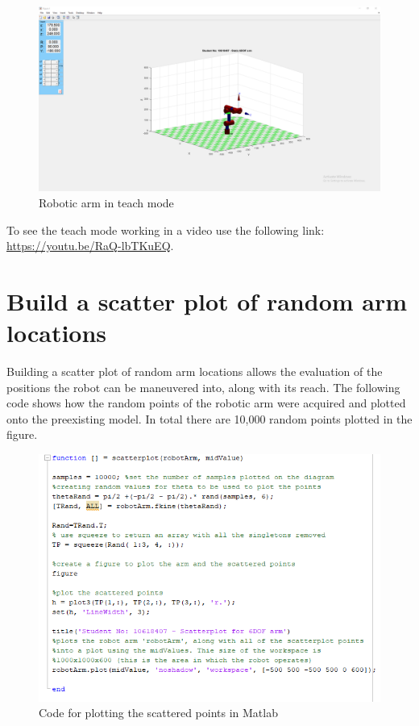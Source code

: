 \documentclass [11pt]{report}
\begin{document}
\begin{figure}[H]
\centerline{\includegraphics[width=18cm]{teachRobotArmPlot.png}}
\caption{Robotic arm in teach mode}
\label{fig}
\end{figure}

To see the teach mode working in a video use the following link: \href{https://youtu.be/RaQ-lbTKuEQ}{https://youtu.be/RaQ-lbTKuEQ}.

\section{Build a scatter plot of random arm locations}

Building a scatter plot of random arm locations allows the evaluation of the positions the robot can be maneuvered into, along with its reach. The following code shows how the random points of the robotic arm were acquired and plotted onto the preexisting model. In total there are 10,000 random points plotted in the figure.

\begin{figure}[H]
\centerline{\includegraphics[width=12cm]{scatterplotCode.png}}
\caption{Code for plotting the scattered points in Matlab}
\label{fig}
\end{figure}
\end{document}
